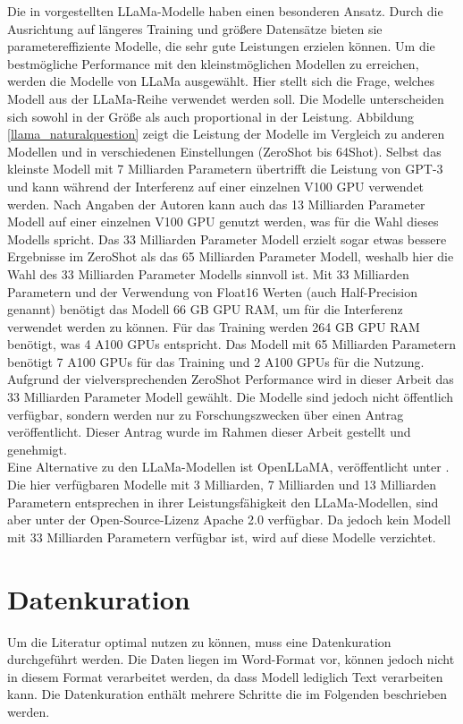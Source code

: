 Die in \citet{llama} vorgestellten LLaMa-Modelle haben einen besonderen Ansatz.
Durch die Ausrichtung auf längeres Training und größere Datensätze bieten sie parametereffiziente Modelle, die sehr gute Leistungen erzielen können.
Um die bestmögliche Performance mit den kleinstmöglichen Modellen zu erreichen, werden die Modelle von LLaMa ausgewählt.
Hier stellt sich die Frage, welches Modell aus der LLaMa-Reihe verwendet werden soll.
Die Modelle unterscheiden sich sowohl in der Größe als auch proportional in der Leistung.
Abbildung \ref{llama_naturalquestion} zeigt die Leistung der Modelle im Vergleich zu anderen Modellen und in verschiedenen Einstellungen (ZeroShot bis 64Shot). %
Selbst das kleinste Modell mit 7 Milliarden Parametern übertrifft die Leistung von GPT-3 und kann während der Interferenz auf einer einzelnen V100 GPU verwendet werden.
Nach Angaben der Autoren kann auch das 13 Milliarden Parameter Modell auf einer einzelnen V100 GPU genutzt werden, was für die Wahl dieses Modells spricht.
Das 33 Milliarden Parameter Modell erzielt sogar etwas bessere Ergebnisse im ZeroShot als das 65 Milliarden Parameter Modell, weshalb hier die Wahl des 33 Milliarden Parameter Modells sinnvoll ist.
Mit 33 Milliarden Parametern und der Verwendung von Float16 Werten (auch Half-Precision genannt) benötigt das Modell 66 GB GPU RAM, um für die Interferenz verwendet werden zu können.
Für das Training werden 264 GB GPU RAM benötigt, was 4 A100 GPUs entspricht.
Das Modell mit 65 Milliarden Parametern benötigt 7 A100 GPUs für das Training und 2 A100 GPUs für die Nutzung.
Aufgrund der vielversprechenden ZeroShot Performance wird in dieser Arbeit das 33 Milliarden Parameter Modell gewählt.
Die Modelle sind jedoch nicht öffentlich verfügbar, sondern werden nur zu Forschungszwecken über einen Antrag veröffentlicht.
Dieser Antrag wurde im Rahmen dieser Arbeit gestellt und genehmigt.\\

Eine Alternative zu den LLaMa-Modellen ist OpenLLaMA, veröffentlicht unter \citet{openllama}. %
Die hier verfügbaren Modelle mit 3 Milliarden, 7 Milliarden und 13 Milliarden Parametern entsprechen in ihrer Leistungsfähigkeit den LLaMa-Modellen, sind aber unter der Open-Source-Lizenz Apache 2.0 verfügbar.
Da jedoch kein Modell mit 33 Milliarden Parametern verfügbar ist, wird auf diese Modelle verzichtet.\\

\section{Datenkuration}
Um die Literatur optimal nutzen zu können, muss eine Datenkuration durchgeführt werden.
Die Daten liegen im Word-Format vor, können jedoch nicht in diesem Format verarbeitet werden, da dass Modell lediglich Text verarbeiten kann.
Die Datenkuration enthält mehrere Schritte die im Folgenden beschrieben werden.\\

